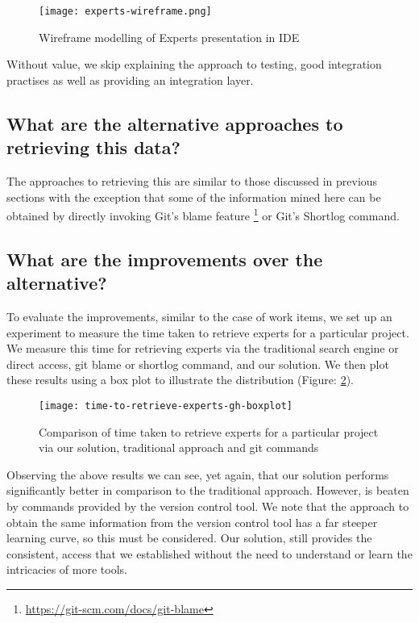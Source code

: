 \begin{figure}[h!]
	\centering
	\texttt{[image: experts-wireframe.png]}
	\caption{Wireframe modelling of Experts presentation in IDE}
	\label{fig:expertsWireframe}
\end{figure}

Without value, we skip explaining the approach to testing, good integration practises as well as providing an integration layer.

\subsection{What are the alternative approaches to retrieving this data?}

The approaches to retrieving this are similar to those discussed in previous sections with the exception that some of the information mined here can be obtained by directly invoking Git's blame feature \footnote{\url{https://git-scm.com/docs/git-blame}} or Git's Shortlog command.

\subsection{What are the improvements over the alternative?}

To evaluate the improvements, similar to the case of work items, we set up an experiment to measure the time taken to retrieve experts for a particular project. We measure this time for retrieving experts via the traditional search engine or direct access, git blame or shortlog command, and our solution. We then plot these results using a box plot to illustrate the distribution (Figure: \ref{fig:time-to-retrieve-experts-gh-boxplot}).

\begin{figure}[h!]
	\centering
	\texttt{[image: time-to-retrieve-experts-gh-boxplot]}
	\caption{Comparison of time taken to retrieve experts for a particular project via our solution, traditional approach and git commands}
	\label{fig:time-to-retrieve-experts-gh-boxplot}
\end{figure}

Observing the above results we can see, yet again, that our solution performs significantly better in comparison to the traditional approach. However, is beaten by commands provided by the version control tool. We note that the approach to obtain the same information from the version control tool has a far steeper learning curve, so this must be considered. Our solution, still provides the consistent, access that we established without the need to understand or learn the intricacies of more tools.

